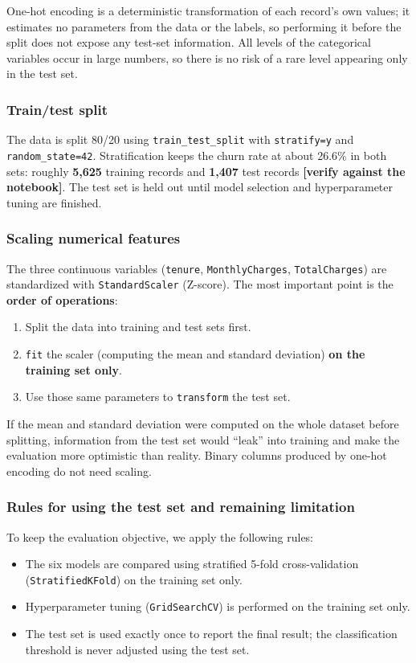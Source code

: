 One-hot encoding is a deterministic transformation of each record's own values; it estimates no parameters from the data or the labels, so performing it before the split does not expose any test-set information. All levels of the categorical variables occur in large numbers, so there is no risk of a rare level appearing only in the test set.

\subsubsection{Train/test split}

The data is split 80/20 using \texttt{train\_test\_split} with \texttt{stratify=y} and \texttt{random\_state=42}. Stratification keeps the churn rate at about 26.6\% in both sets: roughly \textbf{5,625} training records and \textbf{1,407} test records \textbf{[verify against the notebook]}. The test set is held out until model selection and hyperparameter tuning are finished.

\subsubsection{Scaling numerical features}

The three continuous variables (\texttt{tenure}, \texttt{MonthlyCharges}, \texttt{TotalCharges}) are standardized with \texttt{StandardScaler} (Z-score). The most important point is the \textbf{order of operations}:
\begin{enumerate}
    \item Split the data into training and test sets first.
    \item \texttt{fit} the scaler (computing the mean and standard deviation) \textbf{on the training set only}.
    \item Use those same parameters to \texttt{transform} the test set.
\end{enumerate}
If the mean and standard deviation were computed on the whole dataset before splitting, information from the test set would ``leak'' into training and make the evaluation more optimistic than reality. Binary columns produced by one-hot encoding do not need scaling.

\subsubsection{Rules for using the test set and remaining limitation}

To keep the evaluation objective, we apply the following rules:
\begin{itemize}
    \item The six models are compared using stratified 5-fold cross-validation (\texttt{StratifiedKFold}) on the training set only.
    \item Hyperparameter tuning (\texttt{GridSearchCV}) is performed on the training set only.
    \item The test set is used exactly once to report the final result; the classification threshold is never adjusted using the test set.
\end{itemize}

